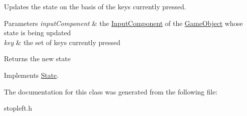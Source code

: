 Updates the state on the basis of the keys currently pressed. 


\begin{DoxyParams}{Parameters}
{\em input\-Component} & the \hyperlink{classInputComponent}{Input\-Component} of the \hyperlink{classGameObject}{Game\-Object} whose state is being updated \\
\hline
{\em key} & the set of keys currently pressed \\
\hline
\end{DoxyParams}
\begin{DoxyReturn}{Returns}
the new state 
\end{DoxyReturn}


Implements \hyperlink{classState_a5f2bc9804614c5ca9e7feb7d8c57668d}{State}.



The documentation for this class was generated from the following file\-:\begin{DoxyCompactItemize}
\item 
stopleft.\-h\end{DoxyCompactItemize}
